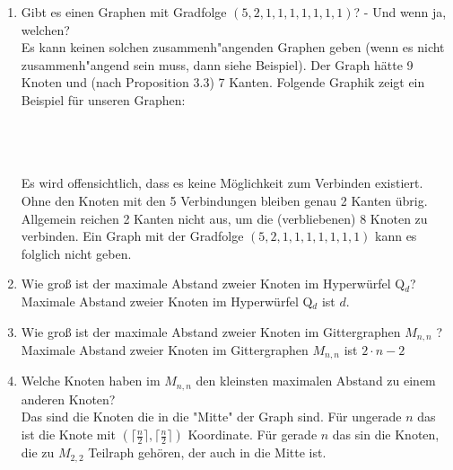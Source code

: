 \begin{enumerate}[label=(\alph*)]
        \item Gibt es einen Graphen mit Gradfolge $(5, 2, 1, 1, 1, 1, 1, 1, 1)$? - Und wenn ja, welchen?\\
        Es kann keinen solchen zusammenh"angenden Graphen geben (wenn es nicht zusammenh"angend sein muss, 
        dann siehe Beispiel). Der Graph hätte 9 Knoten und (nach Proposition 3.3) 7 Kanten. 
        Folgende Graphik zeigt ein Beispiel für unseren Graphen: \\\\
        \\\\
        Es wird offensichtlich, dass es keine Möglichkeit zum Verbinden existiert. Ohne den Knoten mit 
        den 5 Verbindungen bleiben genau 2 Kanten übrig. Allgemein reichen 2 Kanten  nicht aus, um die 
        (verbliebenen) 8 Knoten zu verbinden. Ein Graph mit der Gradfolge $(5,2,1,1,1,1,1,1,1)$ kann es 
        folglich nicht geben. 
         
        \item Wie groß ist der maximale Abstand zweier Knoten im Hyperwürfel Q$_d$? \\
        Maximale Abstand zweier Knoten im Hyperwürfel Q$_d$ ist $d$.
        
        \item Wie groß ist der maximale Abstand zweier Knoten im Gittergraphen $M_{n,n}$ ? \\
        Maximale Abstand zweier Knoten im Gittergraphen $M_{n,n}$ ist $2\cdot n - 2$
        
        \item Welche Knoten haben im $M_{n,n}$ den kleinsten maximalen Abstand zu einem anderen Knoten? \\
        Das sind die Knoten die in die "Mitte" der Graph sind. Für ungerade $n$ das ist die Knote mit
        $(\big\lceil\frac{n}{2}\big\rceil,\big\lceil\frac{n}{2}\big\rceil)$ Koordinate. 
        Für gerade $n$ das sin die Knoten, die zu $M_{2,2}$ Teilraph gehören, der auch in die Mitte ist.
        

\end{enumerate}
